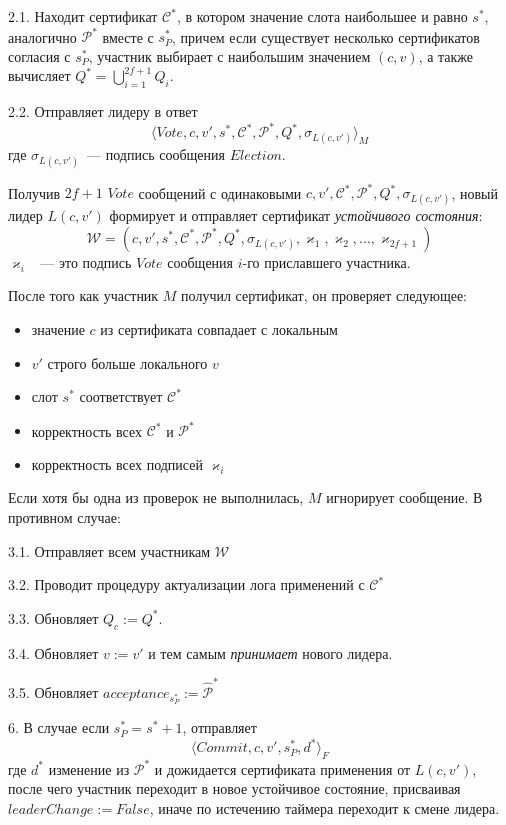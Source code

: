 2.1. Находит сертификат $\mathcal{C}^{*}$, в котором значение слота наибольшее и равно $s^{*}$, аналогично $\mathcal{P}^{*}$ вместе с  $s_P^{*}$, причем если существует несколько сертификатов согласия с $s_P^{*}$, участник выбирает с наибольшим значением $(c, v)$, а также вычисляет $Q^{*}=\bigcup\limits_{i=1}^{2f+1} Q_i$.

2.2. Отправляет лидеру в ответ
\[ \langle Vote, c, v', s^{*}, \mathcal{C}^{*}, \mathcal{P}^{*}, Q^{*}, \sigma_{L(c, v')} \rangle_M \]
где $\sigma_{L(c, v')}$~--- подпись сообщения $Election$.
\vspace{10pt}

Получив $2f+1$ $Vote$ сообщений с одинаковыми $c, v', \mathcal{C}^{*}, \mathcal{P}^{*}, Q^{*}, \sigma_{L(c, v')}$, новый лидер $L(c, v')$ формирует и отправляет сертификат \textit{устойчивого состояния}:
$$\mathcal{W}=(c, v', s^{*}, \mathcal{C}^{*}, \mathcal{P}^{*}, Q^{*}, \sigma_{L(c, v')}, \varkappa_1, \varkappa_2,..., \varkappa_{2f+1})$$
$\varkappa_i$ ~--- это подпись $Vote$ сообщения $i$-го приславшего участника.

После того как участник $M$ получил сертификат, он проверяет следующее:
\begin{itemize}
\item значение $c$ из сертификата совпадает с локальным
\item $v'$ строго больше локального $v$
\item слот $s^{*}$ соответствует $\mathcal{C}^{*}$
\item корректность всех $\mathcal{C}^{*}$ и $\mathcal{P}^{*}$
\item корректность всех подписей $\varkappa_i$
\end{itemize}
Если хотя бы одна из проверок не выполнилась, $M$ игнорирует сообщение. В противном случае:

3.1. Отправляет всем участникам $\mathcal{W}$

3.2. Проводит процедуру актуализации лога применений с $\mathcal{C}^{*}$

3.3. Обновляет $Q_c := Q^{*}$.

3.4. Обновляет $v := v'$ и тем самым \textit{принимает} нового лидера.

3.5. Обновляет $acceptance_{s_P^{*}} := \hat{\mathcal{P}}^{*}$

6. В случае если $s_P^{*}=s^{*}+1$, отправляет
\[ \langle Commit, c, v', s_P^{*}, d^{*} \rangle_F \]
где $d^{*}$ изменение из $\mathcal{P}^{*}$ и дожидается сертификата применения от $L(c, v')$, после чего участник переходит в новое устойчивое состояние, присваивая $leaderChange := False$, иначе по истечению таймера переходит к смене лидера.

